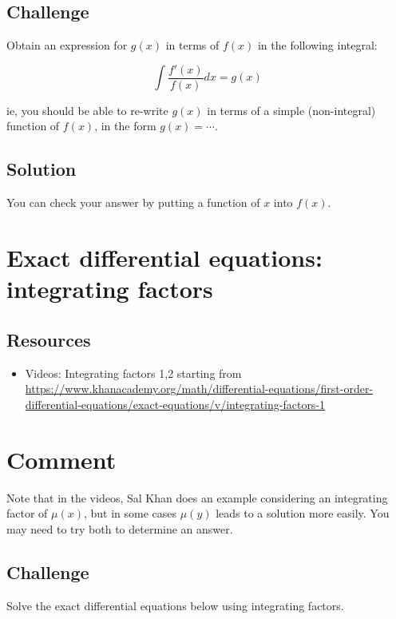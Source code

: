 \subsection*{Challenge}
Obtain an expression for $g(x)$ in terms of $f(x)$ in the following integral:

\begin{equation}
    \int \frac{f'(x)}{f(x)} dx = g(x)
\end{equation}

ie, you should be able to re-write $g(x)$ in terms of a simple (non-integral) function of $f(x)$, in the form $g(x) = \cdots$.

\subsection*{Solution}
You can check your answer by putting a function of $x$ into $f(x)$.

\timebox




\newpage
\section{Exact differential equations: integrating factors}
\label{sec:edeif}

\subsection*{Resources}
\begin{itemize}
    \item Videos: Integrating factors 1,2 starting from \url{https://www.khanacademy.org/math/differential-equations/first-order-differential-equations/exact-equations/v/integrating-factors-1}
\end{itemize}

\section*{Comment}
Note that in the videos, Sal Khan does an example considering an integrating factor of $\mu(x)$, but in some cases $\mu(y)$ leads to a solution more easily. You may need to try both to determine an answer.

\subsection*{Challenge}
Solve the exact differential equations below using integrating factors.

